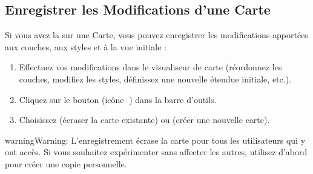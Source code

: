 \documentclass[letterpaper,10pt,english]{sphinxmanual}
\begin{document}
\subsection{Enregistrer les Modifications d’une Carte}
\label{\detokenize{fr/04_explorer_cartes:enregistrer-les-modifications-d-une-carte}}
\sphinxAtStartPar
Si vous avez la  sur une Carte, vous pouvez enregistrer
les modifications apportées aux couches, aux styles et à la vue initiale :
\begin{enumerate}
%
\item {} 
\sphinxAtStartPar
Effectuez vos modifications dans le visualiseur de carte (réordonnez les couches,
modifiez les styles, définissez une nouvelle étendue initiale, etc.).

\item {} 
\sphinxAtStartPar
Cliquez sur le bouton  (icône 💾) dans la barre d’outils.

\item {} 
\sphinxAtStartPar
Choisissez  (écraser la carte existante) ou 
(créer une nouvelle carte).

\end{enumerate}

\begin{sphinxadmonition}{warning}{Warning:}
\sphinxAtStartPar
L’enregistrement écrase la carte pour tous les utilisateurs qui y ont accès. Si vous
souhaitez expérimenter sans affecter les autres, utilisez d’abord 
pour créer une copie personnelle.
\end{sphinxadmonition}
\end{document}
